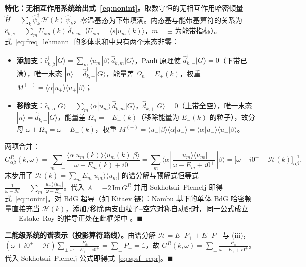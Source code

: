 \documentclass[onecolumn,aps,prl,superscriptaddress,longbibliography]{revtex4-2}
\begin{document}
\textbf{特化：无相互作用系统给出式~\eqref{eq:nonint}。}取数守恒的无相互作用哈密顿量 $\hat{H} = \sum_k \hat{\psi}^\dagger_k\,\mathcal{H}(k)\,\hat{\psi}_k$，零温基态为下带填满。内态基与能带基算符的关系为 $\hat{c}_{k,s} = \sum_m U_{sm}(k)\,\hat{d}_{k,m}$（$U_{sm} = \langle s|u_m(k)\rangle$，$m=\pm$ 为能带指标）。式~\eqref{eq:freq_lehmann} 的多体求和中只有两个末态非零：
\begin{itemize}
\item \textbf{添加支}：$\hat{c}^\dagger_{k,\beta}|G\rangle = \sum_m\langle u_m|\beta\rangle\,\hat{d}^\dagger_{k,m}|G\rangle$，Pauli 原理使 $\hat{d}^\dagger_{k,-}|G\rangle = 0$（下带已满），唯一末态 $|n\rangle = \hat{d}^\dagger_{k,+}|G\rangle$，能量差 $\Omega_n = E_+(k)$，权重 $M^{(-)} = \langle\alpha|u_+\rangle\langle u_+|\beta\rangle$；
\item \textbf{移除支}：$\hat{c}_{k,\alpha}|G\rangle = \sum_m\langle\alpha|u_m\rangle\,\hat{d}_{k,m}|G\rangle$，$\hat{d}_{k,+}|G\rangle = 0$（上带全空），唯一末态 $|n\rangle = \hat{d}_{k,-}|G\rangle$，能量差 $\Omega_n = -E_-(k)$（移除能量为 $E_-(k)$ 的粒子），故分母 $\omega + \Omega_n = \omega - E_-(k)$，权重 $M^{(+)} = \langle u_-|\beta\rangle\langle\alpha|u_-\rangle = \langle\alpha|u_-\rangle\langle u_-|\beta\rangle$。
\end{itemize}
两项合并：
\begin{equation}
G^R_{\alpha\beta}(k,\omega) = \sum_{m=\pm}\frac{\langle\alpha|u_m(k)\rangle\langle u_m(k)|\beta\rangle}{\omega - E_m(k) + i0^+}
= \sum_m \langle\alpha|\,\frac{|u_m\rangle\langle u_m|}{\omega - E_m + i0^+}\,|\beta\rangle
= \big[\omega + i0^+ - \mathcal{H}(k)\big]^{-1}_{\alpha\beta},
\end{equation}
末步用了 $\mathcal{H}(k) = \sum_m E_m|u_m\rangle\langle u_m|$ 的谱分解与预解式恒等式 $\frac{1}{\omega-\mathcal{H}} = \sum_m\frac{|u_m\rangle\langle u_m|}{\omega - E_m}$。代入 $A = -2\,\mathrm{Im}\,G^R$ 并用 Sokhotski--Plemelj 即得式~\eqref{eq:nonint}。对 BdG 超导（如 Kitaev 链）：Nambu 基下的单体 BdG 哈密顿量直接充当 $\mathcal{H}(k)$，添加/移除两支由粒子--空穴对称自动配对，同一公式成立——Estake--Roy 的推导正处在此框架中 \cite{estakeRoy2025}。$\blacksquare$

\textbf{二能级系统的谱表示（投影算符路线）。}由谱分解 $\mathcal{H} = E_+P_+ + E_-P_-$ 与 (iii)，$(\omega + i0^+ - \mathcal{H})\sum_\pm \frac{P_\pm}{\omega - E_\pm + i0^+} = \sum_\pm P_\pm = \mathbb{1}$，故 $G^R(k,\omega) = \sum_\pm \frac{P_\pm}{\omega - E_\pm + i0^+}$。代入 Sokhotski--Plemelj 公式即得式~\eqref{eq:spsf_repr}。$\blacksquare$
\end{document}
